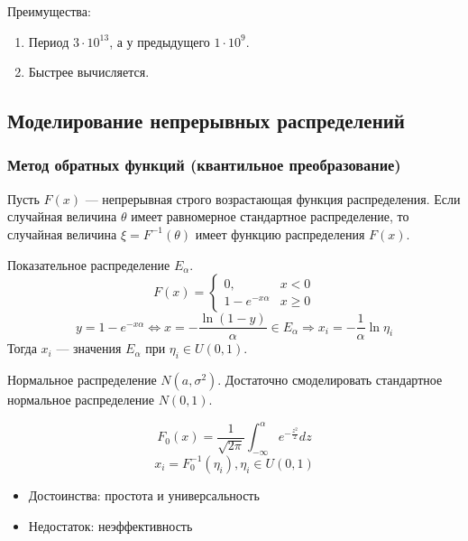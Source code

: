 Преимущества:
\begin{enumerate}
    \item Период \(3 \cdot 10^{13}\), а у предыдущего \(1 \cdot 10^9\).
    \item Быстрее вычисляется.
\end{enumerate}

\subsection{Моделирование непрерывных распределений}

\subsubsection{Метод обратных функций (квантильное преобразование)}

\begin{theorem}
    Пусть \(F(x)\) --- непрерывная строго возрастающая функция распределения. Если случайная величина \(\theta\) имеет равномерное стандартное распределение, то случайная величина \(\xi = F^{-1}(\theta)\) имеет функцию распределения \(F(x)\).
\end{theorem}

\begin{example}
    Показательное распределение \(E_\alpha\).
    \[F(x) = \begin{cases}
            0,               & x < 0    \\
            1 - e^{-x\alpha} & x \geq 0
        \end{cases}\]
    \[y = 1 - e^{ - x\alpha} \Leftrightarrow x = - \frac{\ln(1 - y)}{\alpha} \in E_\alpha \Rightarrow x_i = - \frac{1}{\alpha} \ln \eta_i\]
    Тогда \(x_i\) --- значения \(E_\alpha\) при \(\eta_i \in U(0, 1)\).
\end{example}
\begin{example}
    Нормальное распределение \(N(a, \sigma^2)\). Достаточно смоделировать стандартное нормальное распределение \(N(0, 1)\).

    \[F_0(x) = \frac{1}{\sqrt{2\pi}} \int_{ - \infty }^\alpha e^{-\frac{z^2}{2}} dz\]
    \[x_i = F_0^{-1}(\eta_i), \eta_i \in U(0, 1)\]
\end{example}

\begin{itemize}
    \item Достоинства: простота и универсальность
    \item Недостаток: неэффективность
\end{itemize}

